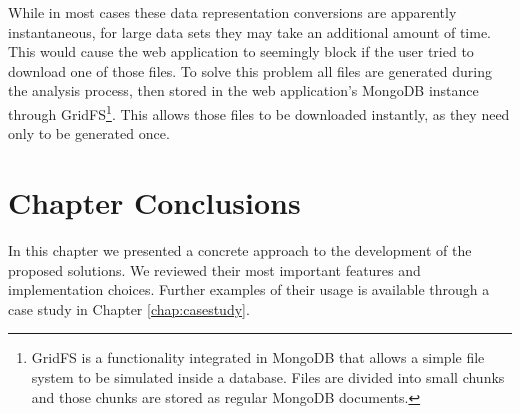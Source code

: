While in most cases these data representation conversions are apparently
instantaneous, for large data sets they may take an additional amount of time.
This would cause the web application to seemingly block if the user tried to
download one of those files. To solve this problem all files are generated
during the analysis process, then stored in the web application's MongoDB
instance through GridFS\footnote{GridFS is a functionality integrated in MongoDB
that allows a simple file system to be simulated inside a database. Files are
divided into small chunks and those chunks are stored as regular MongoDB
documents.}. This allows those files to be downloaded instantly, as they need
only to be generated once.



\section{Chapter Conclusions}


In this chapter we presented a concrete approach to the development of the
proposed solutions. We reviewed their most important features and implementation
choices. Further examples of their usage is available through a case study in
Chapter \ref{chap:casestudy}.
